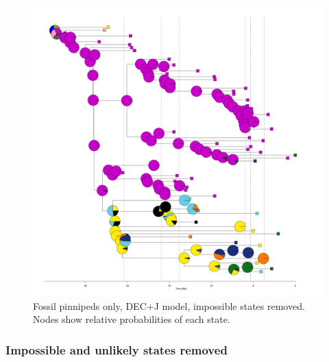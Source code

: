 \documentclass[a4paper, 12pt]{article}
\begin{document}
\begin{figure}[H]
 \centering
  \includegraphics[width = \linewidth]{figures/fossil-pinnipeds-DECj-impossible-pies.png}
  \caption{Fossil pinnipeds only, DEC+J model, impossible states removed. Nodes show relative probabilities of each state.}
  \label{fig-fossil-decj-pie}
\end{figure} 
 
\subsubsection{Impossible and unlikely states removed}
\end{document}
